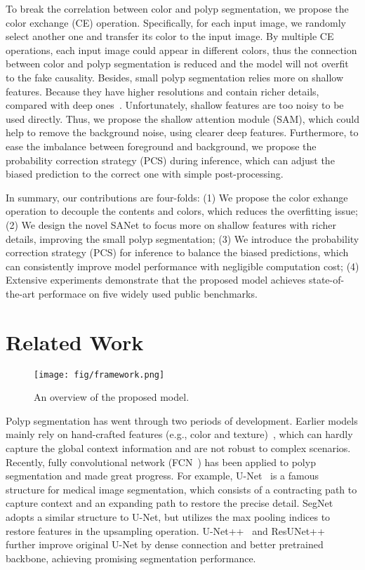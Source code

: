 \documentclass[runningheads]{llncs}
\begin{document}
To break the correlation between color and polyp segmentation, we propose the color exchange (CE) operation. Specifically, for each input image, we randomly select another one and transfer its color to the input image. By multiple CE operations, each input image could appear in different colors, thus the connection between color and polyp segmentation is reduced and the model will not overfit to the fake causality. 
Besides, small polyp segmentation relies more on shallow features. Because they have higher resolutions and contain richer details, compared with deep ones~\cite{wei2020f3net}. Unfortunately, shallow features are too noisy to be used directly. Thus, we propose the shallow attention module (SAM), which could help to remove the background noise, using clearer deep features.
Furthermore, to ease the imbalance between foreground and background, we propose the probability correction strategy (PCS) during inference, which can adjust the biased prediction to the correct one with simple post-processing. 

In summary, our contributions are four-folds: (1) We propose the color exhange operation to decouple the contents and colors, which reduces the overfitting issue; (2) We design the novel SANet to focus more on shallow features with richer details, improving the small polyp segmentation; (3) We introduce the probability correction strategy (PCS) for inference to balance the biased predictions, which can consistently improve model performance with negligible computation cost; (4) Extensive experiments demonstrate that the proposed model achieves state-of-the-art performace on five widely used public benchmarks.

\section{Related Work}
\begin{figure}[t]
    \centering
    \texttt{[image: fig/framework.png]}
    \caption{An overview of the proposed model.}
    \label{fig:framework}
  \end{figure}
Polyp segmentation has went through two periods of development. Earlier models mainly rely on hand-crafted features (e.g., color and texture)~\cite{mamonov2014automated,zhou2020review,tajbakhsh2015automated}, which can hardly capture the global context information and are not robust to complex scenarios. Recently, fully convolutional network (FCN~\cite{long2015fully}) has been applied to polyp segmentation and made great progress. For example, U-Net~\cite{ronneberger2015u} is a famous structure for medical image segmentation, which consists of a contracting path to capture context and an expanding path to restore the precise detail. SegNet~\cite{segnet} adopts a similar structure to U-Net, but utilizes the max pooling indices to restore features in the upsampling operation. U-Net++~\cite{zhou2018unet++} and ResUNet++~\cite{jha2019resunet++} further improve original U-Net by dense connection and better pretrained backbone, achieving promising segmentation performance.
\end{document}
